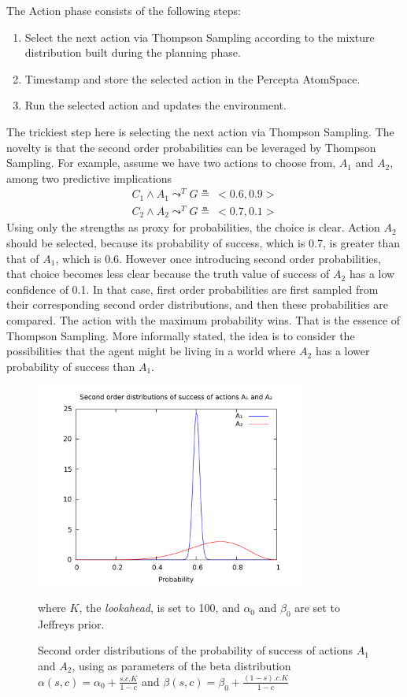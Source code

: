 \documentclass[runningheads]{llncs}
\newcommand{\lpreimp}[1]{\leadsto^{#1}}
\begin{document}
The Action phase consists of the following steps:
\begin{enumerate}
\item Select the next action via Thompson Sampling according to the
  mixture distribution built during the planning phase.
\item Timestamp and store the selected action in the Percepta
  AtomSpace.
\item Run the selected action and updates the environment.
\end{enumerate}
The trickiest step here is selecting the next action via Thompson
Sampling.  The novelty is that the second order probabilities can be
leveraged by Thompson Sampling.  For example, assume we have two
actions to choose from, $A_1$ and $A_2$, among two predictive
implications
$$
\begin{array}{c}
  C_1 \land A_1 \lpreimp{T} G \measeq\ <\!0.6, 0.9\!> \\
  C_2 \land A_2 \lpreimp{T} G \measeq\ <\!0.7, 0.1\!>
\end{array}
$$
Using only the strengths as proxy for probabilities, the choice is
clear.  Action $A_2$ should be selected, because its probability of
success, which is 0.7, is greater than that of $A_1$, which is 0.6.
However once introducing second order probabilities, that choice
becomes less clear because the truth value of success of $A_2$ has a
low confidence of 0.1.  In that case, first order probabilities are
first sampled from their corresponding second order distributions,
and then these probabilities are compared.  The action with the
maximum probability wins.  That is the essence of Thompson Sampling.
More informally stated, the idea is to consider the possibilities that
the agent might be living in a world where $A_2$ has a lower
probability of success than $A_1$.
\begin{figure}
  \centerline{\includegraphics[width=0.8\textwidth]{pictures/actiondist.pdf}}
  \caption{Second order distributions of the probability of success of
    actions $A_1$ and $A_2$, using as parameters of the beta
    distribution $\alpha(s, c)=\alpha_0 + \frac{s.c.K}{1-c}$ and
    $\beta(s, c)=\beta_0 + \frac{(1-s).c.K}{1-c}$} where $K$, the
  \emph{lookahead}, is set to 100, and $\alpha_0$ and $\beta_0$ are
  set to Jeffreys prior.
  \label{fig:actiondist}
\end{figure}
\end{document}
